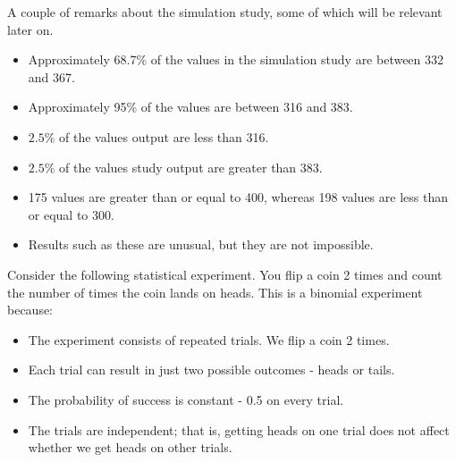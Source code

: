 A couple of remarks about the simulation study, some of which will be relevant later on.
\begin{itemize}
\item Approximately 68.7\% of the values in the simulation study are between 332 and 367.
\item Approximately 95\% of the values are between 316 and 383.
\item $2.5\%$ of the values output are less than 316.
\item $2.5\%$ of the values study output are greater than 383.
\item 175 values are greater than or equal to 400, whereas 198 values are less than or equal to 300.
\item Results such as these are unusual, but they are not impossible.
\end{itemize}





Consider the following statistical experiment. You flip a coin 2 times and count the number of times the coin lands on heads. This is a binomial experiment because:
\begin{itemize}
\item The experiment consists of repeated trials. We flip a coin 2 times.
\item Each trial can result in just two possible outcomes - heads or tails.
\item The probability of success is constant - 0.5 on every trial.
\item The trials are independent; that is, getting heads on one trial does not affect whether we get heads on other trials.
\end{itemize}




